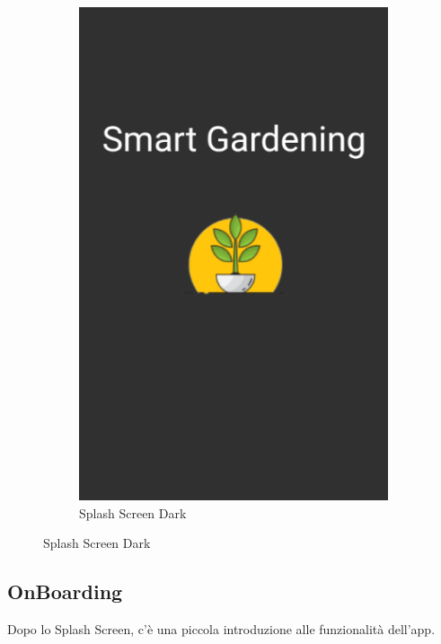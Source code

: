\documentclass[a4paper,12pt]{report}
\begin{document}
\begin{figure}[H]
\begin{subfigure}{0.3\textwidth}
	\includegraphics[width=\textwidth]{./images/splash/splash_screen_dark.png}
	\caption{Splash Screen Dark}
	\label{fig:splash_screen_dark}
\end{subfigure}

\end{figure}

\subsection{OnBoarding}

\textsf{\small Dopo lo Splash Screen, c'è una piccola introduzione alle funzionalità dell'app.}
\end{document}

